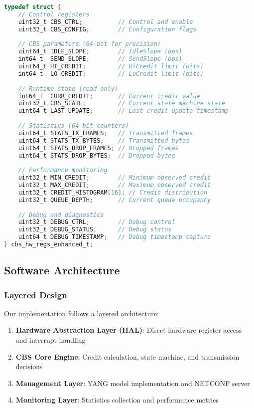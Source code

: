 \documentclass[10pt, journal, compsoc]{IEEEtran}
\begin{document}
\begin{lstlisting}[language=C, caption=Enhanced CBS Hardware Register Structure]
typedef struct {
    // Control registers
    uint32_t CBS_CTRL;          // Control and enable
    uint32_t CBS_CONFIG;        // Configuration flags
    
    // CBS parameters (64-bit for precision)
    uint64_t IDLE_SLOPE;        // IdleSlope (bps)
    int64_t  SEND_SLOPE;        // SendSlope (bps)
    uint64_t HI_CREDIT;         // HiCredit limit (bits)
    int64_t  LO_CREDIT;         // LoCredit limit (bits)
    
    // Runtime state (read-only)
    int64_t  CURR_CREDIT;       // Current credit value
    uint32_t CBS_STATE;         // Current state machine state
    uint64_t LAST_UPDATE;       // Last credit update timestamp
    
    // Statistics (64-bit counters)
    uint64_t STATS_TX_FRAMES;   // Transmitted frames
    uint64_t STATS_TX_BYTES;    // Transmitted bytes
    uint64_t STATS_DROP_FRAMES; // Dropped frames
    uint64_t STATS_DROP_BYTES;  // Dropped bytes
    
    // Performance monitoring
    uint32_t MIN_CREDIT;        // Minimum observed credit
    uint32_t MAX_CREDIT;        // Maximum observed credit
    uint32_t CREDIT_HISTOGRAM[16]; // Credit distribution
    uint32_t QUEUE_DEPTH;       // Current queue occupancy
    
    // Debug and diagnostics
    uint32_t DEBUG_CTRL;        // Debug control
    uint32_t DEBUG_STATUS;      // Debug status
    uint64_t DEBUG_TIMESTAMP;   // Debug timestamp capture
} cbs_hw_regs_enhanced_t;
\end{lstlisting}

\subsection{Software Architecture}

\subsubsection{Layered Design}

Our implementation follows a layered architecture:

\begin{enumerate}
    \item \textbf{Hardware Abstraction Layer (HAL)}: Direct hardware register access and interrupt handling
    \item \textbf{CBS Core Engine}: Credit calculation, state machine, and transmission decisions
    \item \textbf{Management Layer}: YANG model implementation and NETCONF server
    \item \textbf{Monitoring Layer}: Statistics collection and performance metrics
\end{enumerate}
\end{document}
